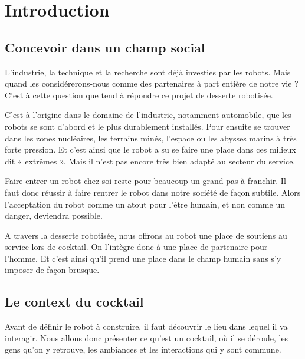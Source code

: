 \chapter*{Introduction}


\section{Concevoir dans un champ social}

L’industrie, la technique et la recherche sont déjà investies par les robots. Mais quand les considérerons-nous comme des partenaires à part entière de notre vie ? C’est à cette question que tend à répondre ce projet de desserte robotisée.

C’est à l’origine dans le domaine de l’industrie, notamment automobile, que les robots se sont d’abord et le plus durablement installés. Pour ensuite se trouver dans les zones nucléaires, les terrains minés, l’espace ou les abysses marins à très forte pression. Et c’est ainsi que le robot a su se faire une place dans ces milieux dit « extrêmes ». Mais il n’est pas encore très bien adapté au secteur du service.

Faire entrer un robot chez soi reste pour beaucoup un grand pas à franchir. Il faut donc réussir à faire rentrer le robot dans notre société de façon subtile. Alors l’acceptation du robot comme un atout pour l’être humain, et non comme un danger, deviendra possible.

A travers la desserte robotisée, nous offrons au robot une place de soutiens au service lors de cocktail. On l’intègre donc à une place de partenaire pour l’homme. Et c’est ainsi qu’il prend une place dans le champ humain sans s’y imposer de façon brusque.


\section{Le context du cocktail}

Avant de définir le robot à construire, il faut découvrir le lieu dans lequel il va interagir. Nous allons donc présenter ce qu’est un cocktail, où il se déroule, les gens qu’on y retrouve, les ambiances et les interactions qui y sont commune.

